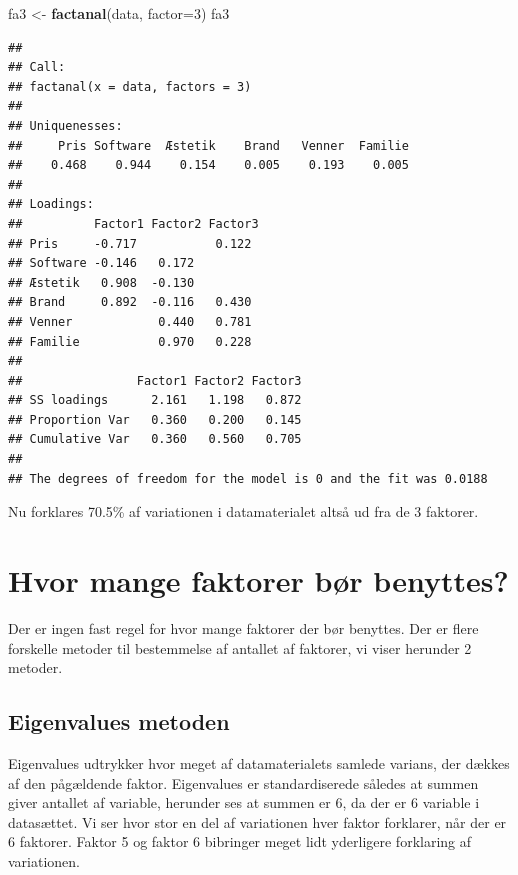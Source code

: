 \documentclass[]{book}
\newenvironment{Shaded}{\begin{snugshade}}{\end{snugshade}}
\newcommand{\DataTypeTok}[1]{\textcolor[rgb]{0.13,0.29,0.53}{#1}}
\newcommand{\DecValTok}[1]{\textcolor[rgb]{0.00,0.00,0.81}{#1}}
\newcommand{\KeywordTok}[1]{\textcolor[rgb]{0.13,0.29,0.53}{\textbf{#1}}}
\newcommand{\NormalTok}[1]{#1}
\newcommand{\StringTok}[1]{\textcolor[rgb]{0.31,0.60,0.02}{#1}}
\begin{document}
\begin{Shaded}
\begin{Highlighting}[]
\NormalTok{fa3 <-}\StringTok{ }\KeywordTok{factanal}\NormalTok{(data, }\DataTypeTok{factor=}\DecValTok{3}\NormalTok{)}
\NormalTok{fa3}
\end{Highlighting}
\end{Shaded}

\begin{verbatim}
## 
## Call:
## factanal(x = data, factors = 3)
## 
## Uniquenesses:
##     Pris Software  Æstetik    Brand   Venner  Familie 
##    0.468    0.944    0.154    0.005    0.193    0.005 
## 
## Loadings:
##          Factor1 Factor2 Factor3
## Pris     -0.717           0.122 
## Software -0.146   0.172         
## Æstetik   0.908  -0.130         
## Brand     0.892  -0.116   0.430 
## Venner            0.440   0.781 
## Familie           0.970   0.228 
## 
##                Factor1 Factor2 Factor3
## SS loadings      2.161   1.198   0.872
## Proportion Var   0.360   0.200   0.145
## Cumulative Var   0.360   0.560   0.705
## 
## The degrees of freedom for the model is 0 and the fit was 0.0188
\end{verbatim}

Nu forklares 70.5\% af variationen i datamaterialet altså ud fra de 3 faktorer.

\hypertarget{hvor-mange-faktorer-br-benyttes}{%
\section{Hvor mange faktorer bør benyttes?}\label{hvor-mange-faktorer-br-benyttes}}

Der er ingen fast regel for hvor mange faktorer der bør benyttes. Der er flere forskelle metoder til bestemmelse af antallet af faktorer, vi viser herunder 2 metoder.

\hypertarget{eigenvalues-metoden}{%
\subsection{Eigenvalues metoden}\label{eigenvalues-metoden}}

Eigenvalues udtrykker hvor meget af datamaterialets samlede varians, der dækkes af den pågældende faktor. Eigenvalues er standardiserede således at summen giver antallet af variable, herunder ses at summen er 6, da der er 6 variable i datasættet. Vi ser hvor stor en del af variationen hver faktor forklarer, når der er 6 faktorer. Faktor 5 og faktor 6 bibringer meget lidt yderligere forklaring af variationen.
\end{document}
